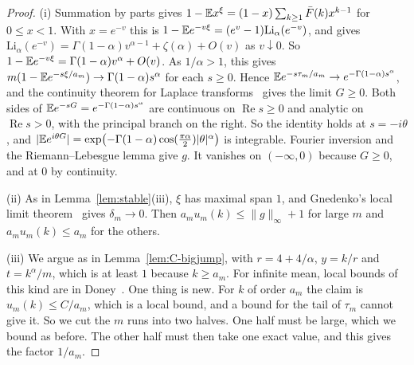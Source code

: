 \begin{proof}
(i) Summation by parts gives $1-\mathbb{E} x^\xi=(1-x)\sum_{k\ge1}\bar F(k)x^{k-1}$ for
$0\le x<1$. With $x=e^{-v}$ this is
$1-\mathbb{E} e^{-v\xi}=(e^v-1)\mathrm{Li}_\alpha(e^{-v})$, and \cite[25.12.12]{dlmf} gives
$\mathrm{Li}_\alpha(e^{-v})=\Gamma(1-\alpha)v^{\alpha-1}+\zeta(\alpha)+O(v)$ as
$v\downarrow0$. So $1-\mathbb{E} e^{-v\xi}=\Gamma(1-\alpha)v^\alpha+O(v)$. As $1/\alpha>1$, this
gives $m(1-\mathbb{E} e^{-s\xi/a_m})\to\Gamma(1-\alpha)s^\alpha$ for each $s\ge0$. Hence
$\mathbb{E} e^{-s\tau_m/a_m}\to e^{-\Gamma(1-\alpha)s^\alpha}$, and the continuity theorem for
Laplace transforms~\cite[Section~XIII.1]{feller1971} gives the limit $G\ge0$. Both
sides of $\mathbb{E} e^{-sG}=e^{-\Gamma(1-\alpha)s^\alpha}$ are continuous on
$\operatorname{Re}s\ge0$ and analytic on $\operatorname{Re}s>0$, with the principal
branch on the right. So the identity holds at $s=-i\theta$, and
$\lvert\mathbb{E} e^{i\theta G}\rvert=\exp\bigl(-\Gamma(1-\alpha)\cos(\frac{\pi\alpha}2)\lvert
\theta\rvert^\alpha\bigr)$ is integrable. Fourier inversion and the Riemann--Lebesgue
lemma give $g$. It vanishes on $(-\infty,0)$ because $G\ge0$, and at $0$ by continuity.

(ii) As in Lemma~\ref{lem:stable}(iii), $\xi$ has maximal span $1$, and Gnedenko's local
limit theorem~\cite[Theorem~4.2.1]{ibragimovlinnik1971} gives $\delta_m\to0$. Then
$a_mu_m(k)\le\lVert g\rVert_\infty+1$ for large $m$ and $a_mu_m(k)\le a_m$ for the
others.

(iii) We argue as in Lemma~\ref{lem:C-bigjump}, with $r=4+4/\alpha$, $y=k/r$ and
$t=k^\alpha/m$, which is at least $1$ because $k\ge a_m$. For infinite mean, local bounds
of this kind are in Doney~\cite{doney1997}. One thing is new. For $k$ of
order $a_m$ the claim is $u_m(k)\le C/a_m$, which is a local bound, and a bound for the
tail of $\tau_m$ cannot give it. So we cut the $m$ runs into two halves. One half must be
large, which we bound as before. The other half must then take one exact value, and this
gives the factor $1/a_m$.


\end{proof}
